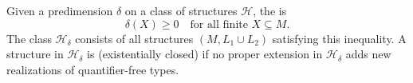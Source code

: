 Given a predimension $\delta$ on a class of structures $\mathcal{H}$, the  is
$$\delta(X) \geq 0 \quad \text{for all finite } X \subseteq M.$$
The class $\mathcal{H}_\delta$ consists of all structures $(M, L_1 \cup L_2)$ satisfying this inequality. A structure in $\mathcal{H}_\delta$ is  (existentially closed) if no proper extension in $\mathcal{H}_\delta$ adds new realizations of quantifier-free types.
